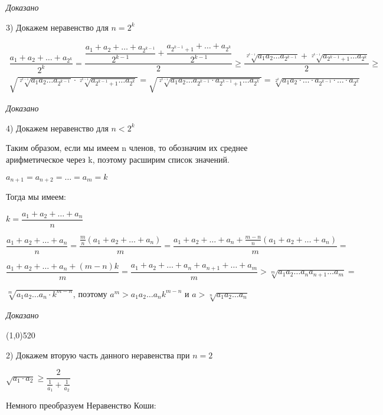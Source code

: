 \documentclass[12pt]{article}
\begin{document}
	{\it Доказано}
	
	\medskip
	
	3) Докажем неравенство для $n=2^k$
	
	\begin{eqnarray*}
		\dfrac{a_1+a_2+\dots+a_{2^k}}{2^{k}} = \dfrac{\dfrac{a_1+a_2+\dots+a_{2^{k-1}}}{2^{k-1}}+\dfrac{a_{2^{k-1}+1}+\dots+a_{2^k}}{2^{k-1}}}{2}\ge \dfrac{\sqrt[2^{k-1}]{a_1a_2\dots a_{2^{k-1}}} + \sqrt[2^{k-1}]{a_{2^{k-1}+1}\dots a_{2^k}}}{2} \ge \\
		\sqrt{\sqrt[2^{k-1}]{a_1a_2\dots a_{2^{k-1}}}\cdot\sqrt[2^{k-1}]{a_{2^{k-1}+1}\dots a_{2^k}}} = \sqrt{\sqrt[2^{k-1}]{a_1a_2\dots a_{2^{k-1}}\cdot a_{2^{k-1}+1}\dots a_{2^k}}} = \sqrt[2^{k}]{a_1a_2\cdot\dots\cdot a_{2^{k-1}}\cdot\dots\cdot a_{2^k}}
	\end{eqnarray*}
	
	{\it Доказано}
	
	\medskip
	
	4) Докажем неравенство для $n<2^k$
	
	Таким образом, если мы имеем n членов, то обозначим их среднее арифметическое через k, поэтому расширим список значений.
	\medskip
	
	$a_{n+1} = a_{n+2}=\dots=a_m = k$ 
	
	Тогда мы имеем:\medskip
	
	$k = \dfrac{a_1+a_2+\dots+a_n}{n}$\medskip
	
	$\dfrac{a_1+a_2+\dots+a_n}{n} = \dfrac{\frac{m}{n}(a_1+a_2+\dots+a_n)}{m} = \dfrac{a_1+a_2+\dots+a_n+\frac{m-n}{n}(a_1+a_2+\dots+a_n)}{m} = $
	\medskip
	
	$
	\dfrac{a_1+a_2+\dots+a_n+(m-n)k}{m} = \dfrac{a_1+a_2+\dots+a_n+a_{n+1}+\dots+a_m}{m} >\sqrt[m]{a_1a_2\dots a_n a_{n+1}\dots a_m} =
	$\medskip
	
	$
		\sqrt[m]{a_1a_2\dots a_n \cdot k^{m-n}}
	$, \hspace{2mm}поэтому $a^m > a_1a_2\dots a_n k^{m-n}$\hspace{2mm} и\hspace{2mm} $a>\sqrt[n]{a_1a_2\dots a_n}$
	
	\medskip
	{\it Доказано}
	
	\medskip
	\line(1,0){520}
	
	2) Докажем вторую часть данного неравенства при $n=2$
	\medskip
	
	\hspace{5mm}$
	\sqrt{a_1\cdot a_2} \ge \dfrac{2}{\frac{1}{a_1}+\frac{1}{a_2}} 
	$
	\medskip
	
	Немного преобразуем Неравенство Коши:\vspace{2mm}
	
\end{document}
